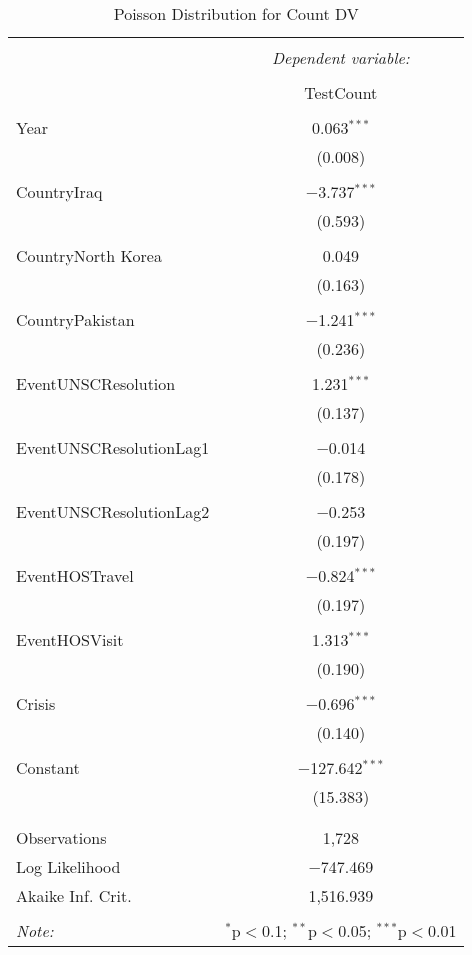 \documentclass{article}
\begin{document}
\begin{table}[!htbp] \centering 
  \caption{Poisson Distribution for Count DV} 
  \label{} 
\begin{tabular}{@{\extracolsep{5pt}}lc} 
\\[-1.8ex]\hline 
\hline \\[-1.8ex] 
 & \multicolumn{1}{c}{\textit{Dependent variable:}} \\ 
\cline{2-2} 
\\[-1.8ex] & TestCount \\ 
\hline \\[-1.8ex] 
 Year & 0.063$^{***}$ \\ 
  & (0.008) \\ 
  & \\ 
 CountryIraq & $-$3.737$^{***}$ \\ 
  & (0.593) \\ 
  & \\ 
 CountryNorth Korea & 0.049 \\ 
  & (0.163) \\ 
  & \\ 
 CountryPakistan & $-$1.241$^{***}$ \\ 
  & (0.236) \\ 
  & \\ 
 EventUNSCResolution & 1.231$^{***}$ \\ 
  & (0.137) \\ 
  & \\ 
 EventUNSCResolutionLag1 & $-$0.014 \\ 
  & (0.178) \\ 
  & \\ 
 EventUNSCResolutionLag2 & $-$0.253 \\ 
  & (0.197) \\ 
  & \\ 
 EventHOSTravel & $-$0.824$^{***}$ \\ 
  & (0.197) \\ 
  & \\ 
 EventHOSVisit & 1.313$^{***}$ \\ 
  & (0.190) \\ 
  & \\ 
 Crisis & $-$0.696$^{***}$ \\ 
  & (0.140) \\ 
  & \\ 
 Constant & $-$127.642$^{***}$ \\ 
  & (15.383) \\ 
  & \\ 
\hline \\[-1.8ex] 
Observations & 1,728 \\ 
Log Likelihood & $-$747.469 \\ 
Akaike Inf. Crit. & 1,516.939 \\ 
\hline 
\hline \\[-1.8ex] 
\textit{Note:}  & \multicolumn{1}{r}{$^{*}$p$<$0.1; $^{**}$p$<$0.05; $^{***}$p$<$0.01} \\ 
\end{tabular} 
\end{table} 
\end{document}
